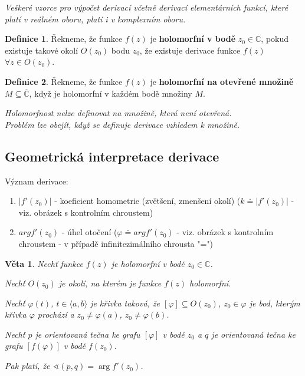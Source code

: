 \documentclass[a4]{report}
\newtheorem{theorem}{Věta}
\theoremstyle{definition}
\newtheorem{definition}{Definice}[section]
\begin{document}
\textit{Veškeré vzorce pro výpočet derivací včetně derivací elementárních funkcí, které platí v reálném oboru, platí i v komplexním oboru.}

\begin{definition}
Řekneme, že funkce $f(z)$ je \textbf{holomorfní v bodě} $z_0\in\mathbb{C}$, pokud existuje takové okolí $O(z_0)$ bodu $z_0$, že existuje derivace funkce $f(z)$  $\forall z \in O(z_0)$.
\end{definition}

\begin{definition}
Řekneme,  že funkce $f(z)$ je \textbf{holomorfní na otevřené množině} $M\subseteq\mathbb{\overline{C}}$, když je holomorfní v každém bodě množiny $M$.
\end{definition}

\textit{Holomorfnost nelze definovat na množině, která není otevřená. \\ Problém lze obejít, když se definuje derivace vzhledem k množině.}

\subsection{Geometrická interpretace derivace}
Význam derivace:
\begin{enumerate}
\item $|f'(z_0)|$ - koeficient homometrie (zvětšení, zmenšení okolí) ($k \doteq |f'(z_0)|$ - viz. obrázek s kontrolním chroustem)
\item $arg f'(z_0)$ - úhel otočení ($\varphi \doteq arg f'(z_0)$ - viz. obrázek s kontrolním chroustem - v případě infinitezimálního chrousta "=")
\end{enumerate}
\begin{theorem}
    Nechť funkce $f(z)$ je holomorfní v bodě $z_0\in\mathbb{C}$. 
    
    Nechť $O(z_0)$ je okolí, na kterém je funkce $f(z)$ holomorfní. 
    
    Nechť $\varphi(t)$, $t\in\langle a,b\rangle$ je křivka taková, že $[\varphi]\subseteq O(z_0)$, $z_0\in\varphi$ je bod, kterým křivka $\varphi$ prochází a $z_0\neq\varphi(a)$, $z_0\neq\varphi(b)$.
    
    Nechť $p$ je orientovaná tečna ke grafu $[\varphi]$ v bodě $z_0$ a $q$ je orientovaná tečna ke grafu $[f(\varphi)]$ v bodě $f(z_0)$.
    
    Pak platí, že $\sphericalangle (p,q) = \arg f'(z_0)$.
\end{theorem}
\end{document}

